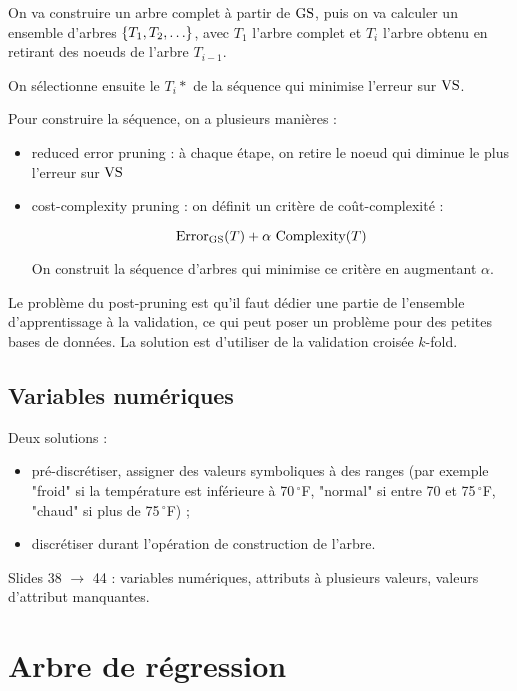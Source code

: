 		On va construire un arbre complet à partir de $\text{GS}$, puis on va calculer un ensemble d'arbres $\ens{T_1, T_2, \dots}$, avec $T_1$ l'arbre complet et $T_i$ l'arbre obtenu en retirant des noeuds de l'arbre $T_{i - 1}$.
		
		On sélectionne ensuite le $T_i*$ de la séquence qui minimise l'erreur sur $\text{VS}$.
		
		
		Pour construire la séquence, on a plusieurs manières :
		
		\begin{itemize}
			\item reduced error pruning : à chaque étape, on retire le noeud qui diminue le plus l'erreur sur $\text{VS}$
			\item cost-complexity pruning : on définit un critère de coût-complexité :
			
			$$\text{Error}_{\text{GS}}(T) + \alpha \text{ Complexity}(T)$$
			
			On construit la séquence d'arbres qui minimise ce critère en augmentant $\alpha$.
		\end{itemize}
		
		
		Le problème du post-pruning est qu'il faut dédier une partie de l'ensemble d'apprentissage à la validation, ce qui peut poser un problème pour des petites bases de données. La solution est d'utiliser de la validation croisée $k$-fold.
	
	\subsection{Variables numériques}
	
	Deux solutions :
	\begin{itemize}
		\item pré-discrétiser, assigner des valeurs symboliques à des ranges (par exemple "froid" si la température est inférieure à 70$\,^{\circ}$F, "normal" si entre 70 et 75$\,^{\circ}$F, "chaud" si plus de 75$\,^{\circ}$F) ;
		\item discrétiser durant l'opération de construction de l'arbre.
		
	\end{itemize}
	
	Slides 38 $\rightarrow$ 44 : variables numériques, attributs à plusieurs valeurs, valeurs d'attribut manquantes.
	
\section{Arbre de régression}
	
